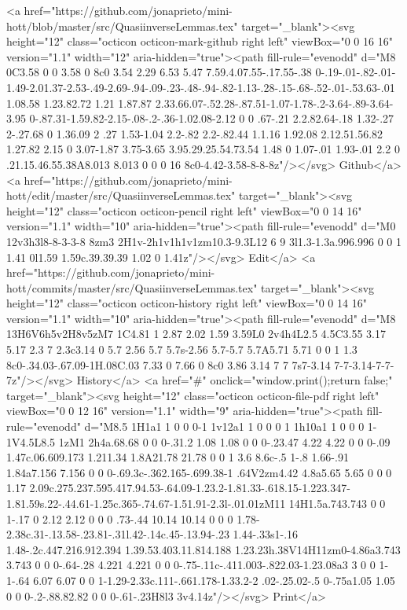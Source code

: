       <a href="https://github.com/jonaprieto/mini-hott/blob/master/src/QuasiinverseLemmas.tex" target="_blank"><svg height="12" class="octicon octicon-mark-github right left" viewBox="0 0 16 16" version="1.1" width="12" aria-hidden="true"><path fill-rule="evenodd" d="M8 0C3.58 0 0 3.58 0 8c0 3.54 2.29 6.53 5.47 7.59.4.07.55-.17.55-.38 0-.19-.01-.82-.01-1.49-2.01.37-2.53-.49-2.69-.94-.09-.23-.48-.94-.82-1.13-.28-.15-.68-.52-.01-.53.63-.01 1.08.58 1.23.82.72 1.21 1.87.87 2.33.66.07-.52.28-.87.51-1.07-1.78-.2-3.64-.89-3.64-3.95 0-.87.31-1.59.82-2.15-.08-.2-.36-1.02.08-2.12 0 0 .67-.21 2.2.82.64-.18 1.32-.27 2-.27.68 0 1.36.09 2 .27 1.53-1.04 2.2-.82 2.2-.82.44 1.1.16 1.92.08 2.12.51.56.82 1.27.82 2.15 0 3.07-1.87 3.75-3.65 3.95.29.25.54.73.54 1.48 0 1.07-.01 1.93-.01 2.2 0 .21.15.46.55.38A8.013 8.013 0 0 0 16 8c0-4.42-3.58-8-8-8z"/></svg> Github</a>
      <a href="https://github.com/jonaprieto/mini-hott/edit/master/src/QuasiinverseLemmas.tex" target="_blank"><svg height="12" class="octicon octicon-pencil right left" viewBox="0 0 14 16" version="1.1" width="10" aria-hidden="true"><path fill-rule="evenodd" d="M0 12v3h3l8-8-3-3-8 8zm3 2H1v-2h1v1h1v1zm10.3-9.3L12 6 9 3l1.3-1.3a.996.996 0 0 1 1.41 0l1.59 1.59c.39.39.39 1.02 0 1.41z"/></svg> Edit</a>
      <a href="https://github.com/jonaprieto/mini-hott/commits/master/src/QuasiinverseLemmas.tex" target="_blank"><svg height="12" class="octicon octicon-history right left" viewBox="0 0 14 16" version="1.1" width="10" aria-hidden="true"><path fill-rule="evenodd" d="M8 13H6V6h5v2H8v5zM7 1C4.81 1 2.87 2.02 1.59 3.59L0 2v4h4L2.5 4.5C3.55 3.17 5.17 2.3 7 2.3c3.14 0 5.7 2.56 5.7 5.7s-2.56 5.7-5.7 5.7A5.71 5.71 0 0 1 1.3 8c0-.34.03-.67.09-1H.08C.03 7.33 0 7.66 0 8c0 3.86 3.14 7 7 7s7-3.14 7-7-3.14-7-7-7z"/></svg> History</a>
      <a  href="#" onclick="window.print();return false;" target="_blank"><svg height="12" class="octicon octicon-file-pdf right left" viewBox="0 0 12 16" version="1.1" width="9" aria-hidden="true"><path fill-rule="evenodd" d="M8.5 1H1a1 1 0 0 0-1 1v12a1 1 0 0 0 1 1h10a1 1 0 0 0 1-1V4.5L8.5 1zM1 2h4a.68.68 0 0 0-.31.2 1.08 1.08 0 0 0-.23.47 4.22 4.22 0 0 0-.09 1.47c.06.609.173 1.211.34 1.8A21.78 21.78 0 0 1 3.6 8.6c-.5 1-.8 1.66-.91 1.84a7.156 7.156 0 0 0-.69.3c-.362.165-.699.38-1 .64V2zm4.42 4.8a5.65 5.65 0 0 0 1.17 2.09c.275.237.595.417.94.53-.64.09-1.23.2-1.81.33-.618.15-1.223.347-1.81.59s.22-.44.61-1.25c.365-.74.67-1.51.91-2.3l-.01.01zM11 14H1.5a.743.743 0 0 1-.17 0 2.12 2.12 0 0 0 .73-.44 10.14 10.14 0 0 0 1.78-2.38c.31-.13.58-.23.81-.31l.42-.14c.45-.13.94-.23 1.44-.33s1-.16 1.48-.2c.447.216.912.394 1.39.53.403.11.814.188 1.23.23h.38V14H11zm0-4.86a3.743 3.743 0 0 0-.64-.28 4.221 4.221 0 0 0-.75-.11c-.411.003-.822.03-1.23.08a3 3 0 0 1-1-.64 6.07 6.07 0 0 1-1.29-2.33c.111-.661.178-1.33.2-2 .02-.25.02-.5 0-.75a1.05 1.05 0 0 0-.2-.88.82.82 0 0 0-.61-.23H8l3 3v4.14z"/></svg> Print</a>

